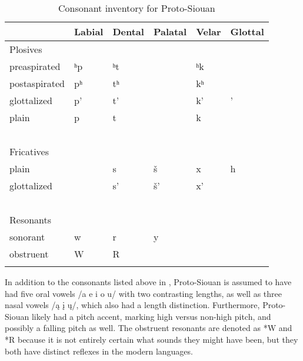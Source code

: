 \documentclass[output=paper]{LSP/langsci}
\begin{document}
\begin{table}[h!]
\caption{Consonant inventory for Proto-Siouan} \label{psiinventory}
    \begin{tabular}{llllll} \lsptoprule
    ~                   & Labial    & Dental     & Palatal & Velar    & Glottal \\
   \midrule
  Plosives   & ~                   & ~                   & ~                & ~                   & ~                \\
    preaspirated        & ʰp & ʰt & ~                & ʰk & ~                \\
    postaspirated       & pʰ & tʰ & ~                & kʰ & ~                \\
    glottalized         & p'                  & t'                  & ~                & k'                  & '                \\
    plain               & p                   & t                   & ~                & k                   & ~                \\
    ~                   & ~                   & ~                   & ~                & ~                   & ~                \\
  Fricatives & ~                   & ~                   & ~                & ~                   & ~                \\
    plain               & ~                   & s                   & \v{s}            & x                   & h                \\
    glottalized         & ~                   & s'                  & \v{s}'           & x'                  & ~                \\
    ~                   & ~                   & ~                   & ~                & ~                   & ~                \\
Resonants  & ~                   & ~                   & ~                & ~                   & ~                \\
    sonorant            & w                   & r                   & y                & ~                   & ~                \\
    obstruent           & W                   & R                   & ~                & ~                   & ~                \\ \lspbottomrule
    \end{tabular}
\end{table}

In addition to the consonants listed above in , Proto-Siouan is assumed to have had five oral vowels /a e i o u/ with two contrasting lengths, as well as three nasal vowels /\k{a} \k{i} \k{u}/, which also had a length distinction. Furthermore, Proto-Siouan likely had a pitch accent, marking high versus non-high pitch, and possibly a falling pitch as well. The obstruent resonants are denoted as *W and *R because it is not entirely certain what sounds they might have been, but they both have distinct reflexes in the modern languages.
\end{document}
